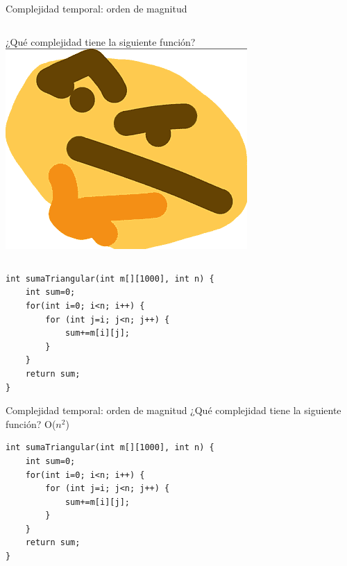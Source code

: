 \documentclass[12pt]{beamer}
\begin{document}
\begin{frame}[fragile]{Complejidad temporal: orden de magnitud}
    \begin{columns}
        ¿Qué complejidad tiene la siguiente función?
        \includegraphics[width=\textwidth]{thinking_meme.png}
    \end{columns}
\begin{lstlisting}
int sumaTriangular(int m[][1000], int n) {
    int sum=0;
    for(int i=0; i<n; i++) {
        for (int j=i; j<n; j++) {
            sum+=m[i][j];
        }
    }
    return sum;
}
\end{lstlisting}
\end{frame}

\begin{frame}[fragile]{Complejidad temporal: orden de magnitud}
    \centering ¿Qué complejidad tiene la siguiente función? O(\alert{$n^2$})\\
    \medskip
\begin{lstlisting}
int sumaTriangular(int m[][1000], int n) {
    int sum=0;
    for(int i=0; i<n; i++) {
        for (int j=i; j<n; j++) {
            sum+=m[i][j];
        }
    }
    return sum;
}
\end{lstlisting}
\end{frame}
\end{document}
